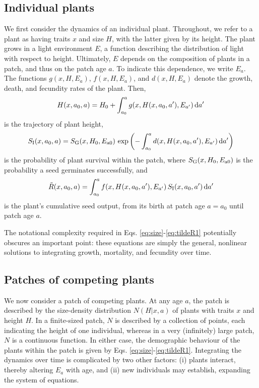 \documentclass[10pt,twoside]{article}
\begin{document}
\subsection{Individual plants}\label{individual-plants}

We first consider the dynamics of an individual plant. Throughout, we refer to a
plant as having traits \(x\) and size \(H\), with the latter given by its height. The
plant grows in a light environment \(E\), a function describing the distribution
of light with respect to height. Ultimately, \(E\) depends on the
composition of plants in a patch, and thus on the patch age \(a\). To indicate this dependence, we
write \(E_a\). The functions \(g(x, H, E_a)\), \(f(x, H, E_a)\), and
\(d(x, H, E_a)\) denote the growth, death, and fecundity rates of the
plant. Then,
\begin{equation} \label{eq:size}
H(x, a_0, a) = H_0 + \int_{a_0}^{a} g(x, H(x, a_0, a^\prime), E_{a^\prime}) \, {\rm d}a^\prime
\end{equation}
is the trajectory of plant height,
\begin{equation} \label{eq:survivalIndividual}
S_{\rm I} (x, a_0, a) = S_{\rm G} (x, H_0, E_{{\rm a}0}) \, \exp\left(- \int_{a_0}^{a} d(x, H(x, a_0, a^\prime), E_{a^\prime}) \, {\rm d} a^\prime \right)
\end{equation}
is the probability of plant survival within the patch, where \(S_{\rm G} (x, H_0, E_{{\rm a}0})\)
is the probability a seed germinates successfully, and
\begin{equation} \label{eq:tildeR1}
\tilde{R}(x, a_0, a) = \int_{a_0}^{a} f(x, H(x, a_0, a^\prime), E_{a^\prime}) \, S_{\rm I} (x, a_0, a^\prime) \, {\rm d} a^\prime
\end{equation}
is the plant's cumulative seed output, from its birth at patch age
\(a = a_0\) until patch age $a$.

The notational complexity required in Eqs. \ref{eq:size}-\ref{eq:tildeR1} potentially obscures an important point: these equations are simply the general, nonlinear solutions to
integrating growth, mortality, and fecundity over time.

\subsection{Patches of competing plants}\label{patches-of-competing-plants-size-structured-populations}

We now consider a patch of competing plants. At any age \(a\), the
patch is described by the size-density distribution \(N(H | x, a)\) of plants
with traits \(x\) and height \(H\). In a finite-sized patch, \(N\) is described by a
collection of points, each indicating the height of one individual, whereas in a very (infinitely) large patch,
\(N\) is a continuous function. In either case, the demographic
behaviour of the plants within the patch is given by Eqs. \ref{eq:size}-\ref{eq:tildeR1}. Integrating the dynamics over time is complicated by
two other factors: (i) plants interact, thereby altering \(E_a\) with
age, and (ii) new individuals may establish, expanding the system of
equations.
\end{document}
